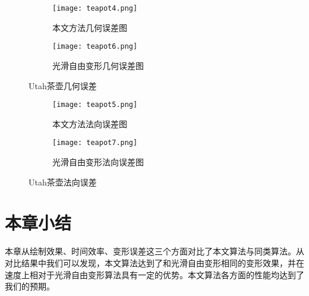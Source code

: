 \begin{figure}[htbp]
	\centering
	\begin{subfigure}[b]{.45\textwidth}
		\centering
		\texttt{[image: teapot4.png]}
		\caption{本文方法几何误差图}\label{subfig:teapot4}
	\end{subfigure}%
	\begin{subfigure}[b]{.45\textwidth}
		\centering
		\texttt{[image: teapot6.png]}
		\caption{光滑自由变形几何误差图}\label{subfig:teapot6}
	\end{subfigure}
	\caption{Utah茶壶几何误差}\label{fig:teapot_error0}
\end{figure}
\begin{figure}[htbp]
	\centering
	\begin{subfigure}[b]{.45\textwidth}
		\centering
		\texttt{[image: teapot5.png]}
		\caption{本文方法法向误差图}\label{subfig:teapot5}
	\end{subfigure}%
	\begin{subfigure}[b]{.45\textwidth}
		\centering
		\texttt{[image: teapot7.png]}
		\caption{光滑自由变形法向误差图}\label{subfig:teapot7}
	\end{subfigure}
	\caption{Utah茶壶法向误差}\label{fig:teapot_error1}
\end{figure}

\section{本章小结}
本章从绘制效果、时间效率、变形误差这三个方面对比了本文算法与同类算法。从对比结果中我们可以发现，本文算法达到了和光滑自由变形相同的变形效果，并在速度上相对于光滑自由变形算法具有一定的优势。本文算法各方面的性能均达到了我们的预期。
